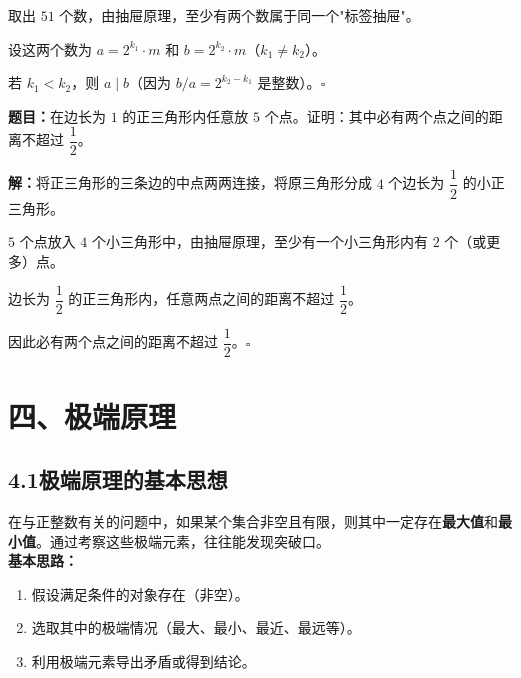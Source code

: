 \documentclass[12pt, a4paper]{ctexart}
\begin{document}
取出 $51$ 个数，由抽屉原理，至少有两个数属于同一个"标签抽屉"。

设这两个数为 $a=2^{k_1}\cdot m$ 和 $b=2^{k_2}\cdot m$（$k_1\neq k_2$）。

若 $k_1<k_2$，则 $a\mid b$（因为 $b/a=2^{k_2-k_1}$ 是整数）。\hfill$\square$

\begin{examplebox}[【例9】几何中的抽屉]
\textbf{题目：}在边长为 $1$ 的正三角形内任意放 $5$ 个点。证明：其中必有两个点之间的距离不超过 $\dfrac{1}{2}$。
\end{examplebox}

\textbf{解：}\;将正三角形的三条边的中点两两连接，将原三角形分成 $4$ 个边长为 $\dfrac{1}{2}$ 的小正三角形。

\begin{center}
\end{center}

$5$ 个点放入 $4$ 个小三角形中，由抽屉原理，至少有一个小三角形内有 $2$ 个（或更多）点。

边长为 $\dfrac{1}{2}$ 的正三角形内，任意两点之间的距离不超过 $\dfrac{1}{2}$。

因此必有两个点之间的距离不超过 $\dfrac{1}{2}$。\hfill$\square$

\newpage
\section*{\textcolor{mainblue}{四、极端原理}}

\subsection*{4.1\quad 极端原理的基本思想}

\begin{knowledgebox}[极端原理]
在与正整数有关的问题中，如果某个集合非空且有限，则其中一定存在\textbf{最大值}和\textbf{最小值}。通过考察这些极端元素，往往能发现突破口。\\[6pt]
\textbf{基本思路：}
\begin{enumerate}[itemsep=2pt]
  \item 假设满足条件的对象存在（非空）。
  \item 选取其中的极端情况（最大、最小、最近、最远等）。
  \item 利用极端元素导出矛盾或得到结论。
\end{enumerate}
\end{knowledgebox}
\end{document}
